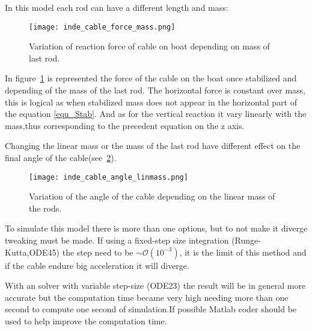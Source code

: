 In this model each rod can have a different length and mass:

\begin{figure}[H]
\centering
    \texttt{[image: inde\_cable\_force\_mass.png]}
    \caption{Variation of reaction force of cable on boat depending on mass of last rod.}
    \label{fig:massForce}
\end{figure}

In figure~\ref{fig:massForce} is represented the force of the cable on the boat once stabilized and depending of the mass of the last rod. The horizontal force is constant over mass, this is logical as when stabilized mass does not appear in the horizontal part of the equation \eqref{equ_Stab}. And as for the vertical reaction it vary linearly with the mass,thus corresponding to the precedent equation on the z axis.

Changing the linear mass or the mass of the last rod have different effect on the final angle of the cable(see~\ref{fig:linmassAngle}).

\begin{figure}[H]
\centering
    \texttt{[image: inde\_cable\_angle\_linmass.png]}
    \caption{Variation of the angle of the cable depending on the linear mass of the rods.}
    \label{fig:linmassAngle}
\end{figure}

To simulate this model there is more than one options, but to not make it diverge tweaking must be made.
If using a fixed-step size integration (Runge-Kutta,ODE45) the step need to be $\sim\mathcal{O}(10^{-3})$, it is the limit of this method and if the cable endure big acceleration it will diverge.

With an solver with variable step-size (ODE23) the result will be in general more accurate but the computation time became very high needing more than one second to compute one second of simulation.If possible Matlab coder should be used to help improve the computation time.
